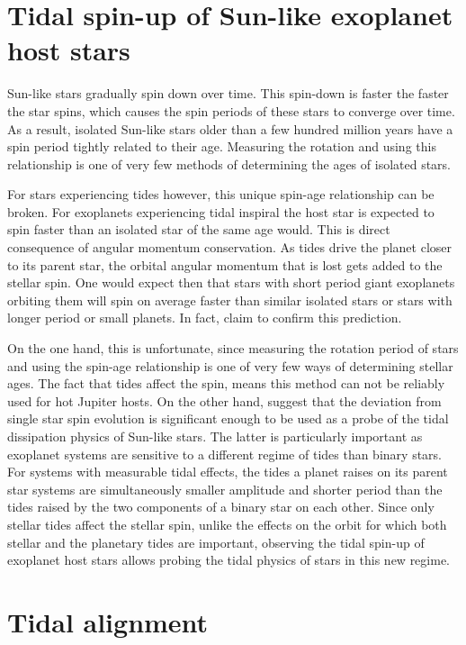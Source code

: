 \section{Tidal spin-up of Sun-like exoplanet host stars}

Sun-like stars gradually spin down over time. This spin-down is faster the
faster the star spins, which causes the spin periods of these stars to converge
over time. As a result, isolated Sun-like stars older than a few hundred million
years have a spin period tightly related to their age. Measuring the rotation
and using this relationship is one of very few methods of determining the ages
of isolated stars.

For stars experiencing tides however, this unique spin-age relationship can be
broken. For exoplanets experiencing tidal inspiral the host star is expected to
spin faster than an isolated star of the same age would. This is direct
consequence of angular momentum conservation. As tides drive the planet closer
to its parent star, the orbital angular momentum that is lost gets added to the
stellar spin. One would expect then that stars with short period giant
exoplanets orbiting them will spin on average faster than similar isolated stars
or stars with longer period or small planets. In fact, \citet{Tajeda_et_al_21}
claim to confirm this prediction.

On the one hand, this is unfortunate, since measuring the rotation period of
stars and using the spin-age relationship is one of very few ways of determining
stellar ages. The fact that tides affect the spin, means this method can not be
reliably used for hot Jupiter hosts. On the other hand, \citet{Penev_et_al_18}
suggest that the deviation from single star spin evolution is significant enough
to be used as a probe of the tidal dissipation physics of Sun-like stars. The
latter is particularly important as exoplanet systems are sensitive to a
different regime of tides than binary stars. For systems with measurable tidal
effects, the tides a planet raises on its parent star systems are simultaneously
smaller amplitude and shorter period than the tides raised by the two components
of a binary star on each other. Since only stellar tides affect the stellar
spin, unlike the effects on the orbit for which both stellar and the planetary
tides are important, observing the tidal spin-up of exoplanet host stars allows
probing the tidal physics of stars in this new regime.

\section{Tidal alignment}

